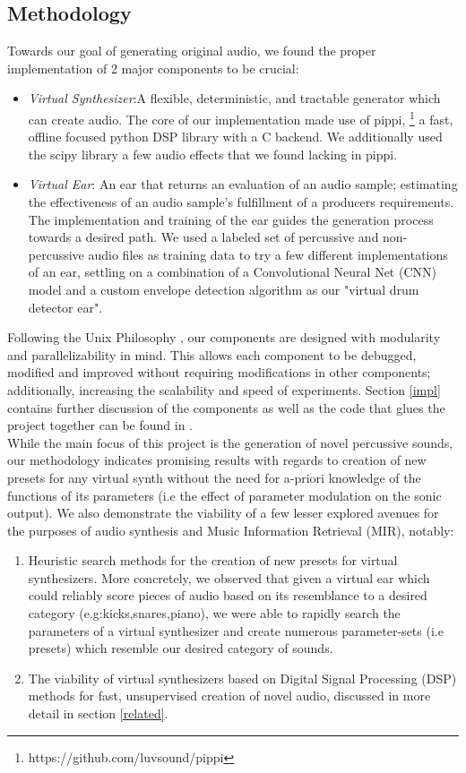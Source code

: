 \documentclass{nime-alternate} %
\begin{document}
\subsection{Methodology}
Towards our goal of generating original audio, we found the proper implementation of 2 major components to be crucial:
\begin{itemize}
    \item \textit{Virtual Synthesizer}:A flexible, deterministic, and tractable generator which can create audio. The core of our implementation made use of pippi, \footnote{https://github.com/luvsound/pippi} a fast, offline focused python DSP library with a C backend. We additionally used the scipy \cite{jones2001scipy} library a few audio effects that we found lacking in pippi. 
    \item \textit{Virtual Ear}: An ear that returns an evaluation of an audio sample; estimating the effectiveness of an audio sample's fulfillment of a producers requirements. The implementation and training of the ear guides the generation process towards a desired path. We used a labeled set of percussive and non-percussive audio files as training data to try a few different implementations of an ear, settling on a combination of a Convolutional Neural Net (CNN) model and a custom envelope detection algorithm as our "virtual drum detector ear". \\
\end{itemize}
Following the Unix Philosophy \cite{gancarz2003linux}, our components are designed with modularity and parallelizability in mind. This allows each component to be debugged, modified and improved without requiring modifications in other components; additionally, increasing the scalability and speed of experiments.
Section \ref{impl} contains further discussion of the components as well as the code that glues the project together can be found in .\\ 
While the main focus of this project is the generation of novel percussive sounds, our methodology indicates promising results with regards to creation of new presets for any virtual synth without the need for a-priori knowledge of the functions of its parameters (i.e the effect of parameter modulation on the sonic output). We also demonstrate the viability of a few lesser explored avenues for the purposes of audio synthesis and Music Information Retrieval (MIR), notably:
\begin{enumerate}[label=\roman*]
\item Heuristic search methods for the creation of new presets for virtual synthesizers. More concretely, we observed that given a virtual ear which could reliably score pieces of audio based on its resemblance to a desired category (e.g:kicks,snares,piano), we were able to rapidly search the parameters of a virtual synthesizer and create numerous parameter-sets (i.e presets) which resemble our desired category of sounds.
\item The viability of virtual synthesizers based on Digital Signal Processing (DSP) methods for fast, unsupervised creation of novel audio, discussed in more detail in section \ref{related}. \\
\end{enumerate}
\end{document}
